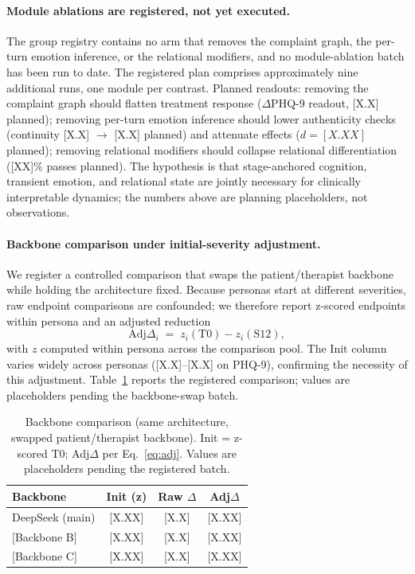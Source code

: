 \documentclass[10pt]{article}
\begin{document}
\paragraph{Module ablations are registered, not yet executed.}
The group registry contains no arm that removes the complaint graph, the per-turn emotion inference, or the relational modifiers, and no module-ablation batch has been run to date.
The registered plan comprises approximately nine additional runs, one module per contrast.
Planned readouts: removing the complaint graph should flatten treatment response ($\Delta$PHQ-9 readout, [X.X] planned); removing per-turn emotion inference should lower authenticity checks (continuity [X.X] $\rightarrow$ [X.X] planned) and attenuate effects ($d = [X.XX]$ planned); removing relational modifiers should collapse relational differentiation ([XX]\% passes planned).
The hypothesis is that stage-anchored cognition, transient emotion, and relational state are jointly necessary for clinically interpretable dynamics; the numbers above are planning placeholders, not observations.

\paragraph{Backbone comparison under initial-severity adjustment.}
We register a controlled comparison that swaps the patient/therapist backbone while holding the architecture fixed.
Because personas start at different severities, raw endpoint comparisons are confounded; we therefore report z-scored endpoints within persona and an adjusted reduction
\begin{equation}\label{eq:adj}
\mathrm{Adj}\Delta_i \;=\; z_i(\mathrm{T0}) - z_i(\mathrm{S12}),
\end{equation}
with $z$ computed within persona across the comparison pool.
The Init column varies widely across personas ([X.X]--[X.X] on PHQ-9), confirming the necessity of this adjustment.
Table~\ref{tab:backbone} reports the registered comparison; values are placeholders pending the backbone-swap batch.

\begin{table}[h]
\centering
\caption{Backbone comparison (same architecture, swapped patient/therapist backbone). Init = z-scored T0; Adj$\Delta$ per Eq.~\ref{eq:adj}. Values are placeholders pending the registered batch.}
\label{tab:backbone}
\small
\begin{tabular}{@{}lccc@{}}
\toprule
Backbone & Init (z) & Raw $\Delta$ & Adj$\Delta$ \\
\midrule
DeepSeek (main) & [X.XX] & [X.X] & [X.XX] \\
{[}Backbone B{]} & [X.XX] & [X.X] & [X.XX] \\
{[}Backbone C{]} & [X.XX] & [X.X] & [X.XX] \\
\bottomrule
\end{tabular}
\end{table}
\end{document}
